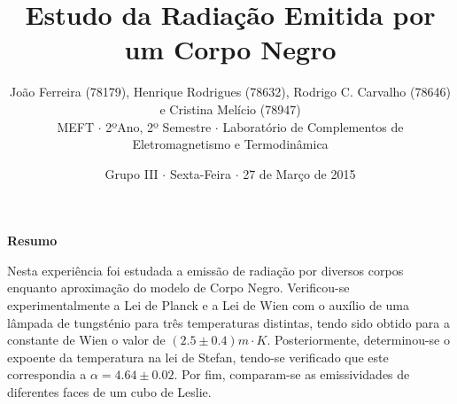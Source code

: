 \documentclass[9pt]{extarticle}
\renewenvironment{abstract}
 {\small
  \begin{center}
  \bfseries \abstractname\vspace{-.5em}\vspace{0pt}
  \end{center}
  \list{}{
    \setlength{\leftmargin}{0cm}%
    \setlength{\rightmargin}{\leftmargin}%
  }%
  \item\relax}
 {\endlist}
\renewcommand{\abstractname}{Resumo}
\begin{document}
\title {\bf \huge Estudo da Radiação Emitida por um Corpo Negro}
\author
{{\small João Ferreira (78179), Henrique Rodrigues (78632), Rodrigo C. Carvalho (78646) e Cristina Melício (78947)} \\
{\small MEFT $\cdot$ 2ºAno, 2º Semestre $\cdot$ Laboratório de Complementos de Eletromagnetismo e Termodinâmica}}
\date{{\small Grupo III $\cdot$ Sexta-Feira $\cdot$ 27 de Março de 2015}}
\maketitle

\begin{abstract}  
\par Nesta experiência foi estudada a emissão de radiação por diversos corpos enquanto aproximação do modelo de Corpo Negro. Verificou-se experimentalmente a Lei de Planck e a Lei de Wien com o auxílio de uma lâmpada de tungsténio para três temperaturas distintas, tendo sido obtido para a constante de Wien o valor de $(2.5\pm0.4)m\cdot K$. Posteriormente, determinou-se o expoente da temperatura na lei de Stefan, tendo-se verificado que este correspondia a $\alpha=4.64\pm0.02$. Por fim, comparam-se as emissividades de diferentes faces de um cubo de Leslie.
\end{abstract}
\end{document}
